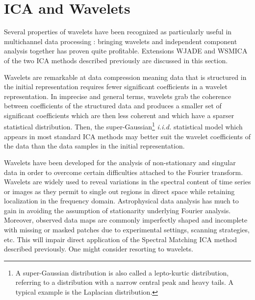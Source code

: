 \section{ICA and Wavelets} 


Several properties of wavelets have been recognized as particularly useful in multichannel data processing : bringing wavelets and 
independent component analysis together has proven quite profitable. Extensions WJADE and WSMICA of the two ICA methods described 
previously are discussed in this section.

Wavelets are remarkable at data compression meaning data that is structured in the initial representation requires fewer significant 
coefficients in a wavelet representation. In imprecise and general terms, wavelets grab the coherence between coefficients of the 
structured data and produces a smaller set of significant coefficients which are then less coherent and which have a sparser statistical 
distribution. Then, the super-Gaussian\footnote{A super-Gaussian distribution is also called a lepto-kurtic distribution, referring to a 
distribution with a narrow central peak and heavy tails. A typical example is the Laplacian distribution.} \emph{i.i.d.} statistical model 
which appears in most standard ICA methods may better suit the wavelet coefficients of the data than the data samples in the initial representation. 

Wavelets have been developed for the analysis of non-stationary and singular data in order to overcome certain difficulties attached to 
the Fourier transform. Wavelets are widely used to reveal variations in the spectral content of time series or images as they permit to 
single out regions in direct space while retaining localization in the frequency domain. Astrophysical data analysis has much to gain in 
avoiding the assumption of stationarity underlying Fourier analysis. Moreover, observed data maps are commonly imperfectly shaped and 
incomplete with missing or masked patches due to experimental settings, scanning strategies, etc. This will impair direct application of 
the Spectral Matching ICA method described previously. One might consider resorting to wavelets.     
          
 



